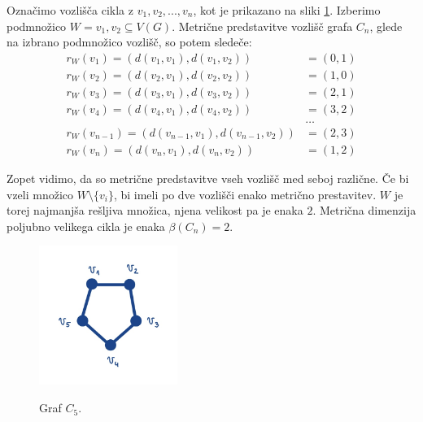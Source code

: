 \documentclass[mat1, tisk]{fmfdelo}
\begin{document}
\begin{primer}\label{primer_2.5.}
    Označimo vozlišča cikla z $v_1, v_2, ..., v_n$, kot je prikazano na sliki \ref{fig:cikel}. 
    Izberimo podmnožico $W = {v_1, v_2} \subseteq V(G).$ Metrične predstavitve vozlišč grafa $C_n$, 
    glede na izbrano podmnožico vozlišč, so potem sledeče:
    \begin{align*}
        r_W(v_1) = (d(v_1, v_1), d(v_1, v_2)) & = (0, 1) \\
        r_W(v_2) = (d(v_2, v_1), d(v_2, v_2)) & = (1, 0) \\
        r_W(v_3) = (d(v_3, v_1), d(v_3, v_2)) & = (2, 1) \\
        r_W(v_4) = (d(v_4, v_1), d(v_4, v_2)) & = (3, 2) \\
        & \dots \\
        r_W(v_{n-1}) = (d(v_{n-1}, v_1), d(v_{n-1}, v_2)) & = (2, 3) \\
        r_W(v_n) = (d(v_n, v_1), d(v_n, v_2)) & = (1, 2)
    \end{align*}
    
    Zopet vidimo, da so metrične predstavitve vseh vozlišč med seboj različne. Če bi vzeli 
    množico $W \setminus \{v_i\}$, bi imeli po dve vozlišči enako metrično prestavitev.
    $W$  je torej najmanjša rešljiva množica, njena velikost pa je enaka $2$. Metrična 
    dimenzija poljubno velikega cikla je enaka $\beta(C_n) = 2.$

    \begin{figure}[h]
        \caption{Graf $C_5$.}
        \centering
        \includegraphics[width=0.4\textwidth]{IMG_cikel.jpg}
        \label{fig:cikel}
    \end{figure}

\end{primer}
\end{document}
